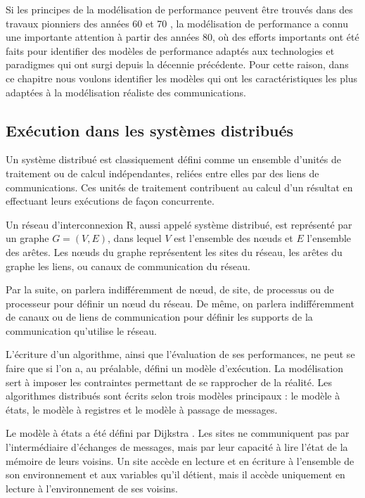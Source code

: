 Si les principes de la modélisation de performance peuvent être trouvés
dans des travaux pionniers des années 60 et 70 \cite{Peterson81},
la modélisation de performance a connu une importante attention à
partir des années 80, où des efforts importants ont été faits pour
identifier des modèles de performance adaptés aux technologies et
paradigmes qui ont surgi depuis la décennie précédente. Pour cette
raison, dans ce chapitre nous voulons identifier les modèles qui ont les caractéristiques
les plus adaptées à la modélisation réaliste des communications.


\subsection{Exécution dans les systèmes distribués}

Un système distribué est classiquement défini comme un ensemble
d'unités de traitement ou de calcul indépendantes, reliées entre elles
par des liens de communications. Ces unités de traitement contribuent
au calcul d'un résultat en effectuant leurs exécutions de façon
concurrente.

Un réseau d'interconnexion {\cal R}, aussi appelé système distribué,
est représenté par un graphe $G =(V,E)$, dans lequel $V$ est
l'ensemble des n{\oe}uds et $E$ l'ensemble des arêtes. Les n{\oe}uds
du graphe représentent les sites du réseau, les arêtes du graphe les
liens, ou canaux de communication du réseau.

Par la suite, on parlera indifféremment de n{\oe}ud, de site, de
processus ou de processeur pour définir un n{\oe}ud du réseau. De
même, on parlera indifféremment de canaux ou de liens de communication
pour définir les supports de la communication qu'utilise le réseau.

L'écriture d'un algorithme, ainsi que l'évaluation de ses
performances, ne peut se faire que si l'on a, au préalable, défini un
modèle d'exécution. La modélisation sert à imposer les contraintes
permettant de se rapprocher de la réalité. Les algorithmes distribués
sont écrits selon trois modèles principaux : le modèle à états, le
modèle à registres et le modèle à passage de messages.

Le modèle à états a été défini par Dijkstra \cite{Dij74}. Les sites ne
communiquent pas par l'intermédiaire d'échanges de messages, mais par
leur capacité à lire l'état de la mémoire de leurs voisins. Un site
accède en lecture et en écriture à l'ensemble de son environnement et
aux variables qu'il détient, mais il accède uniquement en lecture à
l'environnement de ses voisins.

